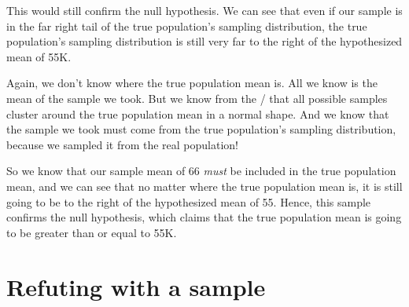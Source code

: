 \documentclass[../../../main.tex]{subfiles}
\begin{document}
\begin{center}
\end{center}

\noindent
This would still confirm the null hypothesis. We can see that even if our sample is in the far right tail of the true population's sampling distribution, the true population's sampling distribution is still very far to the right of the hypothesized mean of 55K. 

Again, we don't know where the true population mean is. All we know is the mean of the sample we took. But we know from the \CLT/ that all possible samples cluster around the true population mean in a normal shape. And we know that the sample we took must come from the true population's sampling distribution, because we sampled it from the real population! 

So we know that our sample mean of 66 \emph{must} be included in the true population mean, and we can see that no matter where the true population mean is, it is still going to be to the right of the hypothesized mean of 55. Hence, this sample confirms the null hypothesis, which claims that the true population mean is going to be greater than or equal to 55K.


\section{Refuting with a sample}
\end{document}
